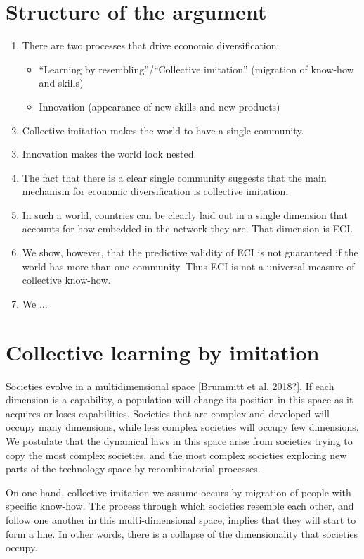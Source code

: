 \documentclass{pnastwo}
\begin{document}
\begin{article}
\section{Structure of the argument}
\begin{enumerate}
    \item There are two processes that drive economic diversification:
    \begin{itemize}
        \item ``Learning by resembling''/``Collective imitation'' (migration of know-how and skills)
        \item Innovation (appearance of new skills and new products)
    \end{itemize}
    \item Collective imitation makes the world to have a single community.
    \item Innovation makes the world look nested.
    \item The fact that there is a clear single community suggests that the main mechanism for economic diversification is collective imitation.
    \item In such a world, countries can be clearly laid out in a single dimension that accounts for how embedded in the network they are. That dimension is ECI.
    \item We show, however, that the predictive validity of ECI is not guaranteed if the world has more than one community. Thus ECI is not a universal measure of collective know-how.
    \item We ...
\end{enumerate}

\section{Collective learning by imitation}
\label{sec:learnbyimitation}
Societies evolve in a multidimensional space [Brummitt et al. 2018?]. If each dimension is a capability, a population will change its position in this space as it acquires or loses capabilities. Societies that are complex and developed will occupy many dimensions, while less complex societies will occupy few dimensions. We postulate that the dynamical laws in this space arise from societies trying to copy the most complex societies, and the most complex societies exploring new parts of the technology space by recombinatorial processes.

On one hand, collective imitation we assume occurs by migration of people with specific know-how. The process through which societies resemble each other, and follow one another in this multi-dimensional space, implies that they will start to form a line. In other words, there is a collapse of the dimensionality that societies occupy.


\end{article}
\end{document}
